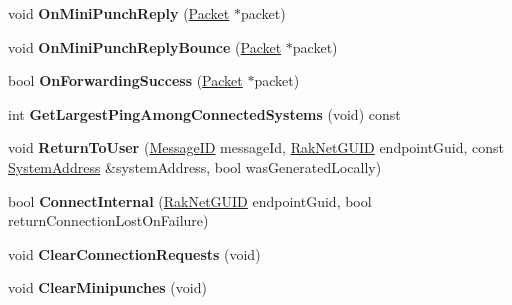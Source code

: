 \begin{DoxyCompactItemize}
\item 
\hypertarget{class_rak_net_1_1_router2_ad65e787648cec225b76019d704dca413}{void {\bfseries On\-Mini\-Punch\-Reply} (\hyperlink{struct_rak_net_1_1_packet}{Packet} $\ast$packet)}\label{class_rak_net_1_1_router2_ad65e787648cec225b76019d704dca413}

\item 
\hypertarget{class_rak_net_1_1_router2_acc835ce3d787893cec9ea234c47b0fa6}{void {\bfseries On\-Mini\-Punch\-Reply\-Bounce} (\hyperlink{struct_rak_net_1_1_packet}{Packet} $\ast$packet)}\label{class_rak_net_1_1_router2_acc835ce3d787893cec9ea234c47b0fa6}

\item 
\hypertarget{class_rak_net_1_1_router2_a051d1ab75e9778f03fa4ed544948b2dd}{bool {\bfseries On\-Forwarding\-Success} (\hyperlink{struct_rak_net_1_1_packet}{Packet} $\ast$packet)}\label{class_rak_net_1_1_router2_a051d1ab75e9778f03fa4ed544948b2dd}

\item 
\hypertarget{class_rak_net_1_1_router2_aedbaae33d16d0a7c7c8f121e346f7363}{int {\bfseries Get\-Largest\-Ping\-Among\-Connected\-Systems} (void) const }\label{class_rak_net_1_1_router2_aedbaae33d16d0a7c7c8f121e346f7363}

\item 
\hypertarget{class_rak_net_1_1_router2_ae06fa8bab280d3d6aa0d3d2de062ec45}{void {\bfseries Return\-To\-User} (\hyperlink{namespace_rak_net_a1b2f3bf4bad2bb6a8360a12295fbed0c}{Message\-I\-D} message\-Id, \hyperlink{struct_rak_net_1_1_rak_net_g_u_i_d}{Rak\-Net\-G\-U\-I\-D} endpoint\-Guid, const \hyperlink{struct_rak_net_1_1_system_address}{System\-Address} \&system\-Address, bool was\-Generated\-Locally)}\label{class_rak_net_1_1_router2_ae06fa8bab280d3d6aa0d3d2de062ec45}

\item 
\hypertarget{class_rak_net_1_1_router2_acf632c62f7e21fc8b91c05c4b87b15f7}{bool {\bfseries Connect\-Internal} (\hyperlink{struct_rak_net_1_1_rak_net_g_u_i_d}{Rak\-Net\-G\-U\-I\-D} endpoint\-Guid, bool return\-Connection\-Lost\-On\-Failure)}\label{class_rak_net_1_1_router2_acf632c62f7e21fc8b91c05c4b87b15f7}

\item 
\hypertarget{class_rak_net_1_1_router2_a60b29d59a7ec4d217c1ab34e04ed9181}{void {\bfseries Clear\-Connection\-Requests} (void)}\label{class_rak_net_1_1_router2_a60b29d59a7ec4d217c1ab34e04ed9181}

\item 
\hypertarget{class_rak_net_1_1_router2_a919ce3fd2a1bb46c5df59fa6640e2d39}{void {\bfseries Clear\-Minipunches} (void)}\label{class_rak_net_1_1_router2_a919ce3fd2a1bb46c5df59fa6640e2d39}


\end{DoxyCompactItemize}
